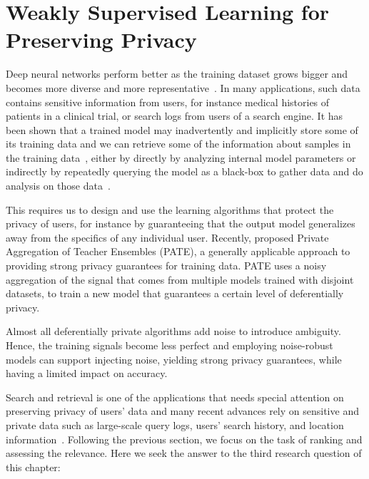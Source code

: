 \section{Weakly Supervised Learning for Preserving Privacy}
Deep neural networks perform better as the training dataset grows bigger and becomes more diverse and more representative~\citep{sun2017revisiting}.  In many applications, such data contains sensitive information from users, for instance medical histories of patients in a clinical trial, or search logs from users of a search engine.  
It has been shown that a trained model may inadvertently
and implicitly store some of its training data and we can retrieve some of the information about samples in the training data~\citep{Shokri:2015}, either by directly by analyzing internal model parameters or indirectly by repeatedly querying the model as a black-box to gather data and do analysis on those data~\citep{Fredrikson:2015}. 

This requires us to design and use the learning algorithms that protect the privacy of users, for instance by guaranteeing that the output model generalizes away from the specifics of any
individual user. Recently, \citet{Papernot:2017} proposed Private Aggregation of Teacher Ensembles (PATE), a generally applicable approach to providing strong privacy guarantees for training data.  PATE uses a noisy aggregation of the signal that comes from multiple models trained with disjoint datasets, to train a new model that guarantees a certain level of deferentially privacy.

Almost all deferentially private algorithms add noise to introduce ambiguity. Hence, the training signals become less perfect and employing noise-robust models can support injecting noise, yielding strong privacy guarantees, while having a limited impact on accuracy.

Search and retrieval is one of the applications that needs special attention on preserving privacy of users' data and many recent advances rely on sensitive and private data such as large-scale query logs, users’ search history, and location information~\citep{Yang:2017}. Following the previous section, we focus on the task of ranking and assessing the relevance.
Here we seek the answer to the third research question of this chapter:
\begin{resqbox}
\emph{}
\end{resqbox}

